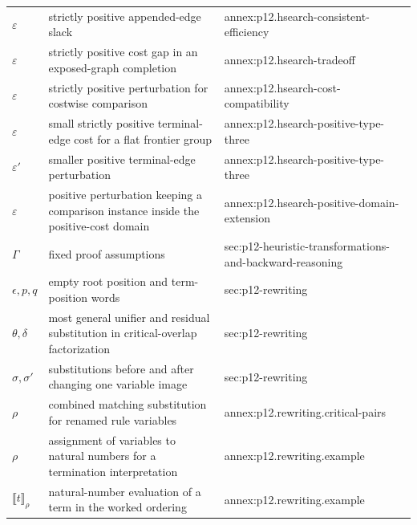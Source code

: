 \begin{longtable}{@{}p{}p{}p{}@{}}
\(\varepsilon\) & strictly positive appended-edge slack & annex:\allowbreak{}p12.\allowbreak{}hsearch-\allowbreak{}consistent-\allowbreak{}efficiency \\
\(\varepsilon\) & strictly positive cost gap in an exposed-graph completion & annex:\allowbreak{}p12.\allowbreak{}hsearch-\allowbreak{}tradeoff \\
\(\varepsilon\) & strictly positive perturbation for costwise comparison & annex:\allowbreak{}p12.\allowbreak{}hsearch-\allowbreak{}cost-\allowbreak{}compatibility \\
\(\varepsilon\) & small strictly positive terminal-edge cost for a flat frontier group & annex:\allowbreak{}p12.\allowbreak{}hsearch-\allowbreak{}positive-\allowbreak{}type-\allowbreak{}three \\
\(\varepsilon'\) & smaller positive terminal-edge perturbation & annex:\allowbreak{}p12.\allowbreak{}hsearch-\allowbreak{}positive-\allowbreak{}type-\allowbreak{}three \\
\(\varepsilon\) & positive perturbation keeping a comparison instance inside the positive-cost domain & annex:\allowbreak{}p12.\allowbreak{}hsearch-\allowbreak{}positive-\allowbreak{}domain-\allowbreak{}extension \\
\(\Gamma\) & fixed proof assumptions & sec:\allowbreak{}p12-\allowbreak{}heuristic-\allowbreak{}transformations-\allowbreak{}and-\allowbreak{}backward-\allowbreak{}reasoning \\
\(\epsilon,\allowbreak p,\allowbreak q\) & empty root position and term-position words & sec:\allowbreak{}p12-\allowbreak{}rewriting \\
\(\theta,\allowbreak \delta\) & most general unifier and residual substitution in critical-overlap factorization & sec:\allowbreak{}p12-\allowbreak{}rewriting \\
\(\sigma,\allowbreak \sigma'\) & substitutions before and after changing one variable image & sec:\allowbreak{}p12-\allowbreak{}rewriting \\
\(\rho\) & combined matching substitution for renamed rule variables & annex:\allowbreak{}p12.\allowbreak{}rewriting.\allowbreak{}critical-\allowbreak{}pairs \\
\(\rho\) & assignment of variables to natural numbers for a termination interpretation & annex:\allowbreak{}p12.\allowbreak{}rewriting.\allowbreak{}example \\
\(\llbracket t\rrbracket_\rho\) & natural-number evaluation of a term in the worked ordering & annex:\allowbreak{}p12.\allowbreak{}rewriting.\allowbreak{}example \\

\end{longtable}
